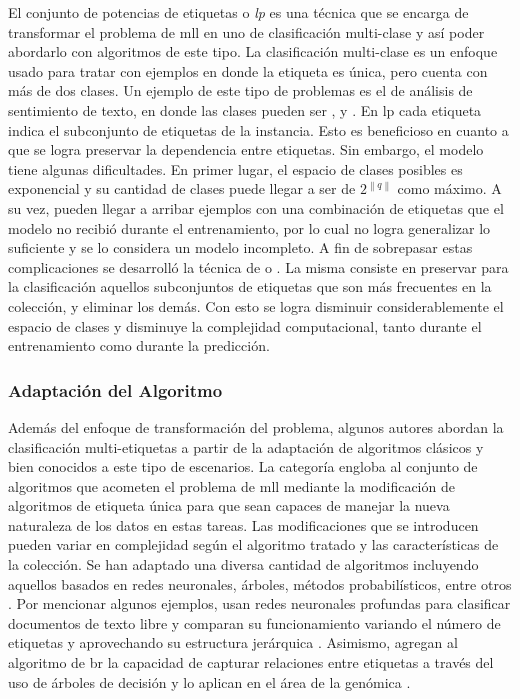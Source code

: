 El conjunto de potencias de etiquetas o \textit{\acrlong{lp}}
\cite{tsoumakas_random_2011} es una técnica que se encarga de transformar el
problema de \acrshort{mll} en uno de clasificación multi-clase y así poder
abordarlo con algoritmos de este tipo. La clasificación multi-clase es un
enfoque usado para tratar con ejemplos en donde la etiqueta es única, pero
cuenta con más de dos clases. Un ejemplo de este tipo de problemas es el de
análisis de sentimiento de texto, en donde las clases pueden ser
,  y . En \acrshort{lp}
cada etiqueta indica el subconjunto de etiquetas de la instancia. Esto es
beneficioso en cuanto a que se logra preservar la dependencia entre etiquetas.
Sin embargo, el modelo tiene algunas dificultades.  En primer lugar, el espacio
de clases posibles es exponencial y su cantidad de clases puede llegar a ser de
$2^{\left\|q\right\|}$ como máximo. A su vez, pueden llegar a arribar ejemplos
con una combinación de etiquetas que el modelo no recibió durante el
entrenamiento, por lo cual no logra generalizar lo suficiente y se lo considera
un modelo incompleto. A fin de sobrepasar estas complicaciones se desarrolló la
técnica de  o . La misma
consiste en preservar para la clasificación aquellos subconjuntos de etiquetas
que son más frecuentes en la colección, y eliminar los demás. Con esto se logra
disminuir considerablemente el espacio de clases y disminuye la complejidad
computacional, tanto durante el entrenamiento como durante la predicción.

\subsubsection{Adaptación del Algoritmo}

Además del enfoque de transformación del problema, algunos autores abordan la
clasificación multi-etiquetas a partir de la adaptación de algoritmos clásicos y
bien conocidos a este tipo de escenarios. La categoría engloba al conjunto de
algoritmos que acometen el problema de \acrshort{mll} mediante la modificación
de algoritmos de etiqueta única para que sean capaces de manejar la nueva
naturaleza de los datos en estas tareas. Las modificaciones que se introducen
pueden variar en complejidad según el algoritmo tratado y las características de
la colección.  Se han adaptado una diversa cantidad de algoritmos incluyendo
aquellos basados en redes neuronales, árboles, métodos probabilísticos, entre
otros \cite{herrera_multilabel_2016}.  Por mencionar algunos ejemplos,
\citeauthor{gargiulo_deep_2018} usan redes neuronales profundas para clasificar
documentos de texto libre y comparan su funcionamiento variando el número de
etiquetas y aprovechando su estructura jerárquica \cite{gargiulo_deep_2018}.
Asimismo, \citeauthor{tanaka_multi-label_2015} agregan al algoritmo de
\acrshort{br} la capacidad de capturar relaciones entre etiquetas a través del
uso de árboles de decisión y lo aplican en el área de la genómica
\cite{tanaka_multi-label_2015}.

